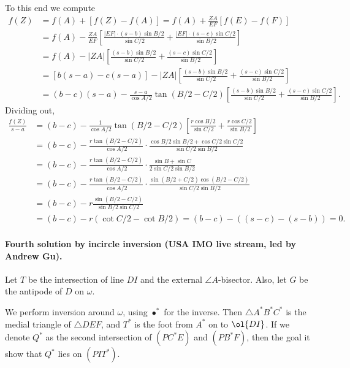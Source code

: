 \documentclass[11pt]{scrartcl}
\begin{document}
To this end we compute
\begin{align*}
  f(Z) &= f(A) + \left[ f(Z) - f(A) \right]
    = f(A) + \frac{ZA}{EF} \left[ f(E)-f(F) \right] \\
  &= f(A) - \frac{ZA}{EF}
  \left[ \frac{|EF| \cdot (s-b) \sin B/2}{\sin C/2}
    + \frac{|EF| \cdot (s-c) \sin C/2}{\sin B/2} \right] \\
  &= f(A) - |ZA| \left[ \frac{(s-b) \sin B/2}{\sin C/2}
    + \frac{(s-c) \sin C/2}{\sin B/2} \right] \\
  &= \left[ b(s-a) - c(s-a) \right]
    - |ZA| \left[ \frac{(s-b) \sin B/2}{\sin C/2}
    + \frac{(s-c) \sin C/2}{\sin B/2} \right] \\
  &= (b-c)(s-a) - \frac{s-a}{\cos A/2} \tan (B/2-C/2)
    \left[ \frac{(s-b) \sin B/2}{\sin C/2}
    + \frac{(s-c) \sin C/2}{\sin B/2} \right].
\end{align*}
Dividing out,
\begin{align*}
  \frac{f(Z)}{s-a}
  &= (b-c) - \frac{1}{\cos A/2} \tan (B/2-C/2)
    \left[ \frac{r \cos B/2}{\sin C/2}
      + \frac{r \cos C/2}{\sin B/2} \right] \\
  &= (b-c) - \frac{r \tan(B/2-C/2)}{\cos A/2}
    \cdot \frac{\cos B/2 \sin B/2 + \cos C/2 \sin C/2}%
    {\sin C/2 \sin B/2} \\
  &= (b-c) - \frac{r \tan(B/2-C/2)}{\cos A/2}
    \cdot \frac{\sin B + \sin C}%
    {2\sin C/2 \sin B/2} \\
  &= (b-c) - \frac{r \tan(B/2-C/2)}{\cos A/2}
    \cdot \frac{\sin(B/2+C/2)\cos(B/2-C/2)}
    {\sin C/2 \sin B/2} \\
  &= (b-c) - r \frac{\sin(B/2-C/2)}{\sin B/2 \sin C/2} \\
  &= (b-c) - r(\cot C/2 - \cot B/2)
    = (b-c) - \left( (s-c) - (s-b) \right) = 0.
\end{align*}
\paragraph{Fourth solution by incircle inversion (USA IMO live stream, led by Andrew Gu).}
Let $T$ be the intersection of line $DI$ and the external $\angle A$-bisector.
Also, let $G$ be the antipode of $D$ on $\omega$.

We perform inversion around $\omega$, using $\bullet^\ast$ for the inverse.
Then $\triangle A^\ast B^\ast C^\ast$
is the medial triangle of $\triangle DEF$,
and $T^\ast$ is the foot from $A^\ast$ on to $\ol{DI}$.
If we denote $Q^\ast$ as the second intersection
of $(PC^\ast E)$ and $(PB^\ast F)$,
then the goal it show that $Q^\ast$ lies on $(PIT^\ast)$.
\end{document}

